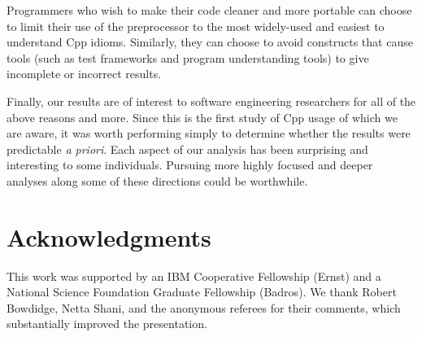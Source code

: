 \documentclass[10pt]{article}
\begin{document}
Programmers who wish to make their code cleaner and more portable can
choose to limit their use of the preprocessor to the most widely-used
and easiest to understand Cpp idioms.  Similarly, they can choose to
avoid constructs that cause tools (such as test frameworks and program
understanding tools) to give incomplete or incorrect results.


Finally, our results are of interest to software engineering researchers
for all of the above reasons and more.  Since this is the first study
of Cpp usage of which we are aware, it was worth performing simply to
determine whether the results were predictable \emph{a priori}. 
Each aspect of our analysis has been surprising and interesting to
some individuals.  Pursuing more highly focused and deeper analyses
along some of these directions could be worthwhile.


\section*{Acknowledgments}

This work was supported by an IBM Cooperative Fellowship (Ernst) and a
National Science Foundation Graduate Fellowship (Badros).  We thank
Robert Bowdidge, Netta Shani, and the anonymous referees for their
comments, which substantially improved the presentation.
    


{\small }
\end{document}
